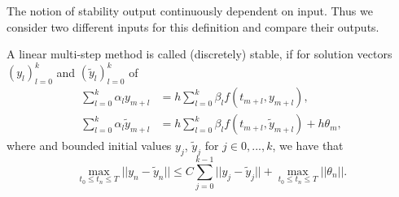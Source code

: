 	
	The notion of stability output continuously dependent on input. Thus we consider two different inputs for this definition and compare their outputs.
	\begin{definition} \label{discrete stability LMSM}
		A linear multi-step method is called (discretely) stable, if for solution vectors $(y_l)_{l=0}^k$ and $(\tilde{y}_l)_{l=0}^k$ of
		\begin{align}
			\sum_{l=0}^{k} \alpha_l y_{m+l} &= h \sum_{l=0}^{k} \beta_l f(t_{m+l}, y_{m+l}), \\
			\sum_{l=0}^{k} \alpha_l \tilde{y}_{m+l} &= h \sum_{l=0}^{k} \beta_l f(t_{m+l}, \tilde{y}_{m+l}) + h\theta_m,
		\end{align} 
		where and bounded initial values $y_j$, $\tilde{y}_j$ for $j \in {0,...,k}$, we have that
		\begin{displaymath}
			\max_{t_0 \leq t_n \leq T} ||y_n - \tilde{y}_n|| \leq C \sum_{j=0}^{k-1} ||y_j - \tilde{y}_j|| + \max_{t_0 \leq t_n \leq T} ||\theta_n||.
		\end{displaymath}
	\end{definition}
	
	
	
	
	
